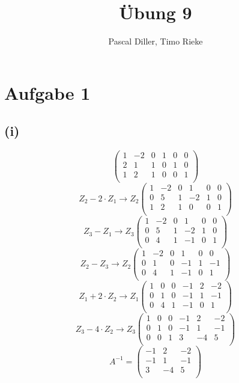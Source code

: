 \documentclass{article}
\title{Übung 9}
\author{Pascal Diller, Timo Rieke}
\begin{document}
\maketitle

\section{Aufgabe 1}
\subsection{(i)}
\[\left(\begin{array}{ccc|ccc}
    1 & -2 & 0 & 1 & 0 & 0 \\
    2 & 1 & 1 & 0 & 1 & 0 \\
    1 & 2 & 1 & 0 & 0 & 1 \\
\end{array}\right)\]
\[Z_2 - 2 \cdot Z_1 \to Z_2 \left(\begin{array}{ccc|ccc}
    1 & -2 & 0 & 1 & 0 & 0 \\
    0 & 5 & 1 & -2 & 1 & 0 \\
    1 & 2 & 1 & 0 & 0 & 1 \\
\end{array}\right)\]
\[Z_3 - Z_1 \to Z_3 \left(\begin{array}{ccc|ccc}
    1 & -2 & 0 & 1 & 0 & 0 \\
    0 & 5 & 1 & -2 & 1 & 0 \\
    0 & 4 & 1 & -1 & 0 & 1 \\
\end{array}\right)\]
\[Z_2 - Z_3 \to Z_2 \left(\begin{array}{ccc|ccc}
    1 & -2 & 0 & 1 & 0 & 0 \\
    0 & 1 & 0 & -1 & 1 & -1 \\
    0 & 4 & 1 & -1 & 0 & 1 \\
\end{array}\right)\]
\[Z_1 + 2 \cdot Z_2 \to Z_1 \left(\begin{array}{ccc|ccc}
    1 & 0 & 0 & -1 & 2 & -2 \\
    0 & 1 & 0 & -1 & 1 & -1 \\
    0 & 4 & 1 & -1 & 0 & 1 \\
\end{array}\right)\]
\[Z_3 - 4 \cdot Z_2 \to Z_3 \left(\begin{array}{ccc|ccc}
    1 & 0 & 0 & -1 & 2 & -2 \\
    0 & 1 & 0 & -1 & 1 & -1 \\
    0 & 0 & 1 & 3 & -4 & 5 \\
\end{array}\right)\]
\[A^{-1} = \begin{pmatrix}
    -1 & 2 & -2 \\
    -1 & 1 & -1 \\
    3 & -4 & 5 \\
\end{pmatrix}\]
\end{document}

